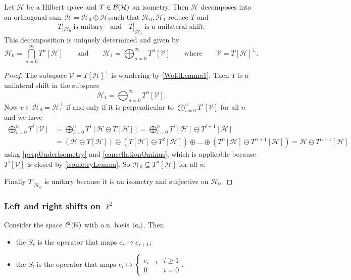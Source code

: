 \begin{theorem}
Let $\mathcal{H}$ be a Hilbert space and $T\in\operatorname{\mathcal{B}}(\mathcal{H})$ an isometry. Then $\mathcal{H}$ decomposes into an orthogonal sum $\mathcal{H} = \mathcal{H}_0\oplus \mathcal{H}_1$such that $\mathcal{H}_0, \mathcal{H}_1$ reduce $T$ and
\[ T|_{\mathcal{H}_0}\;\text{is unitary} \quad\text{and}\quad T|_{\mathcal{H}_1}\;\text{is a unilateral shift}. \]
This decomposition is uniquely determined and given by
\[ \mathcal{H}_0 = \bigcap_{n=0}^\infty T^n[\mathcal{H}] \qquad\text{and}\qquad \mathcal{H}_1 = \bigoplus_{n=0}^\infty T^n[\mathcal{V}] \qquad\text{where}\qquad \mathcal{V} = T[\mathcal{H}]^\perp. \]
\end{theorem}
\begin{proof}
The subspace $\mathcal{V} = T[\mathcal{H}]^\perp$ is wandering by \ref{WoldLemma1}. Then $T$ is a unilateral shift in the subspace
\[ \mathcal{H}_1 = \bigoplus_{n=0}^\infty T^n[\mathcal{V}]. \]
Now $v\in\mathcal{H}_0 = \mathcal{H}_1^\perp$ if and only if it is perpendicular to $\bigoplus_{i=0}^n T^i[\mathcal{V}]$ for all $n$ and we have
\begin{align*}
\bigoplus_{i=0}^n T^i[\mathcal{V}] &= \bigoplus_{i=0}^n T^i[\mathcal{H}\ominus T[\mathcal{H}]] = \bigoplus_{i=0}^n T^i[\mathcal{H}]\ominus T^{i+1}[\mathcal{H}] \\
&= (\mathcal{H}\ominus T[\mathcal{H}])\oplus(T[\mathcal{H}]\ominus T^2[\mathcal{H}])\oplus \ldots \oplus (T^n[\mathcal{H}]\ominus T^{n+1}[\mathcal{H}])  = \mathcal{H} \ominus T^{n+1}[\mathcal{H}] 
\end{align*}
using \ref{perpUnderIsometry} and \ref{cancellationOminus}, which is applicable because $T^i[\mathcal{V}]$ is closed by \ref{isometryLemma}. So $\mathcal{H}_0\subseteq T^n[\mathcal{H}]$ for all $n$.

Finally $T|_{\mathcal{H}_0}$ is unitary because it is an isometry and surjective on $\mathcal{H}_0$.
\end{proof}

\subsubsection{Left and right shifts on $\ell^2$}
\begin{definition}
Consider the space $\ell^2(\mathbb{N})$ with o.n. basis $\left\langle e_i \right\rangle$. Then
\begin{itemize}
\item the  $S_r$ is the operator that maps $e_i \mapsto e_{i+1}$;
\item the  $S_l$ is the operator that maps $e_i \mapsto \begin{cases}
e_{i-1} & i \geq 1 \\ 0 & i = 0
\end{cases}$.
\end{itemize}
\end{definition}

